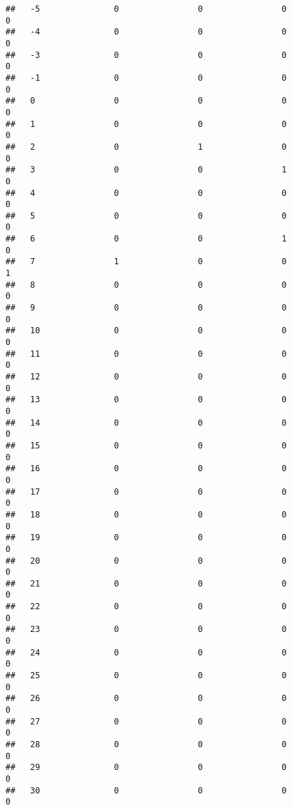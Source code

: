 \documentclass[]{article}
\begin{document}
\begin{verbatim}
##   -5               0                0                0                0
##   -4               0                0                0                0
##   -3               0                0                0                0
##   -1               0                0                0                0
##   0                0                0                0                0
##   1                0                0                0                0
##   2                0                1                0                0
##   3                0                0                1                0
##   4                0                0                0                0
##   5                0                0                0                0
##   6                0                0                1                0
##   7                1                0                0                1
##   8                0                0                0                0
##   9                0                0                0                0
##   10               0                0                0                0
##   11               0                0                0                0
##   12               0                0                0                0
##   13               0                0                0                0
##   14               0                0                0                0
##   15               0                0                0                0
##   16               0                0                0                0
##   17               0                0                0                0
##   18               0                0                0                0
##   19               0                0                0                0
##   20               0                0                0                0
##   21               0                0                0                0
##   22               0                0                0                0
##   23               0                0                0                0
##   24               0                0                0                0
##   25               0                0                0                0
##   26               0                0                0                0
##   27               0                0                0                0
##   28               0                0                0                0
##   29               0                0                0                0
##   30               0                0                0                0

\end{verbatim}
\end{document}
